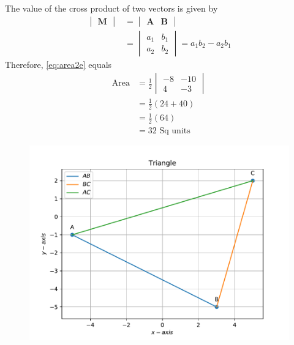 \documentclass[12pt]{article}
\newcommand{\mydet}[1]{\ensuremath{\begin{vmatrix}#1\end{vmatrix}}}
\providecommand{\brak}[1]{\ensuremath{\left(#1\right)}}
\let\vec\mathbf
\begin{document}
\begin{enumerate}
\begin{enumerate}
The value of the cross product of two vectors is given by
\begin{align}
  \label{eq:det2e}
  \mydet{\vec{M}} &= \mydet{\vec{A} & \vec{B}} 
  \\
  &= \mydet{a_1 & b_1\\a_2 & b_2} = a_1b_2 - a_2 b_1
\end{align}
		Therefore, \eqref{eq:area2e} equals \\
\begin{align}
\text{Area} &=	\frac{1}{2}\mydet{-8 & -10\\4 & -3}  \\
	&=	\frac{1}{2}\brak{24+40}  \\
	&=  \frac{1}{2}\brak{64}  \\ 
	&=  32 \text{ Sq units}		       
\end{align}
\begin{figure}[!h]
	\begin{center}
		\includegraphics[width=\columnwidth]{./figs/problem1b.pdf}
	\end{center}
\caption{}
\label{fig:Fig2}
\end{figure}
\end{enumerate}

\end{enumerate}
\end{document}

